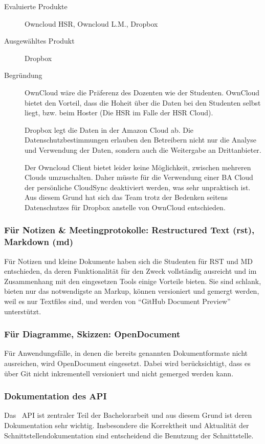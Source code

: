 				\begin{description}
					\item[Evaluierte Produkte] Owncloud HSR, Owncloud L.M., Dropbox
					\item[Ausgewähltes Produkt] Dropbox
					\item[Begründung] OwnCloud wäre die Präferenz des Dozenten wie der Studenten. 
						OwnCloud bietet den Vorteil, dass die Hoheit über die Daten bei den Studenten selbst liegt, bzw. beim Hoster (Die HSR im Falle der HSR Cloud).
						
						Dropbox legt die Daten in der Amazon Cloud ab. 
						Die Datenschutzbestimmungen erlauben den Betreibern nicht nur die Analyse und Verwendung der Daten, 
						sondern auch die Weitergabe an Drittanbieter.
						
						Der Owncloud Client bietet leider keine Möglichkeit, 
						zwischen mehreren Clouds umzuschalten. 
						Daher müsste für die Verwendung einer BA Cloud der persönliche CloudSync deaktiviert werden, 
						was sehr unpraktisch ist.						
						Aus diesem Grund hat sich das Team trotz der Bedenken seitens Datenschutzes für Dropbox anstelle von OwnCloud entschieden.
				\end{description}

			\subsubsection*{Für Notizen \& Meetingprotokolle: Restructured Text (rst), Markdown (md)}
				Für Notizen und kleine Dokumente haben sich die Studenten für RST und MD entschieden, 
				da deren Funktionalität für den Zweck vollständig ausreicht und im Zusammenhang mit den eingesetzen Tools einige Vorteile bieten. 
				Sie sind schlank, bieten nur das notwendigste an Markup, können versioniert und gemergt werden,
				weil es nur Textfiles sind, und werden von "`GitHub Document Preview"' unterstützt.

			\subsubsection*{Für Diagramme, Skizzen: OpenDocument}
				Für Anwendungsfälle, in denen die bereits genannten Dokumentformate nicht ausreichen, 
				wird OpenDocument eingesetzt. Dabei wird berücksichtigt, 
				dass es über Git nicht inkrementell versioniert und nicht
				gemerged werden kann.
				
			\subsubsection*{Dokumentation des API}
				Das \eeppi\ API ist zentraler Teil der Bachelorarbeit und aus diesem Grund ist deren Dokumentation sehr wichtig. Insbesondere die Korrektheit und Aktualität der Schnittstellendokumentation sind entscheidend die Benutzung der Schnittstelle.
				

